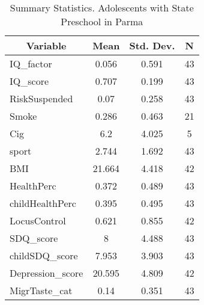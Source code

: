 
\begin{table}[htbp]\centering \caption{Summary Statistics. Adolescents with State Preschool in Parma \label{bothAdolmaternaStatParma}}
\begin{tabular}{l c c  c}\hline\hline
\multicolumn{1}{c}{\textbf{Variable}} & \textbf{Mean}
 & \textbf{Std. Dev.} & \textbf{N}\\ \hline
IQ\_factor & 0.056 & 0.591  & 43\\
IQ\_score & 0.707 & 0.199  & 43\\
RiskSuspended & 0.07 & 0.258  & 43\\
Smoke & 0.286 & 0.463  & 21\\
Cig & 6.2 & 4.025  & 5\\
sport & 2.744 & 1.692  & 43\\
BMI & 21.664 & 4.418  & 42\\
HealthPerc & 0.372 & 0.489  & 43\\
childHealthPerc & 0.395 & 0.495  & 43\\
LocusControl & 0.621 & 0.855  & 42\\
SDQ\_score & 8 & 4.488  & 43\\
childSDQ\_score & 7.953 & 3.903  & 43\\
Depression\_score & 20.595 & 4.809  & 42\\
MigrTaste\_cat & 0.14 & 0.351  & 43\\
\hline\end{tabular}
\end{table}
